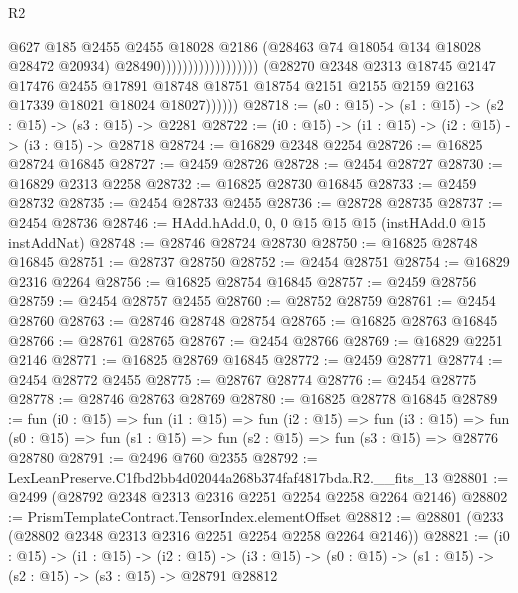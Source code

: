 \begin{lexlean}{R2}
\begin{coremodule}
                                                  @627
                                                  @185
                                                  @2455
                                                  @2455
                                                  @18028
                                                  @2186
                                                  (@28463 @74 @18054 @134 @18028 @28472 @20934)
                                                  @28490))))))))))))))))))
              (@28270
                @2348
                @2313
                @18745
                @2147
                @17476
                @2455
                @17891
                @18748
                @18751
                @18754
                @2151
                @2155
                @2159
                @2163
                @17339
                @18021
                @18024
                @18027))))))
@28718 := (s0 : @15) -> (s1 : @15) -> (s2 : @15) -> (s3 : @15) -> @2281
@28722 := (i0 : @15) -> (i1 : @15) -> (i2 : @15) -> (i3 : @15) -> @28718
@28724 := @16829 @2348 @2254
@28726 := @16825 @28724 @16845
@28727 := @2459 @28726
@28728 := @2454 @28727
@28730 := @16829 @2313 @2258
@28732 := @16825 @28730 @16845
@28733 := @2459 @28732
@28735 := @2454 @28733 @2455
@28736 := @28728 @28735
@28737 := @2454 @28736
@28746 := HAdd.hAdd.{0, 0, 0} @15 @15 @15 (instHAdd.{0} @15 instAddNat)
@28748 := @28746 @28724 @28730
@28750 := @16825 @28748 @16845
@28751 := @28737 @28750
@28752 := @2454 @28751
@28754 := @16829 @2316 @2264
@28756 := @16825 @28754 @16845
@28757 := @2459 @28756
@28759 := @2454 @28757 @2455
@28760 := @28752 @28759
@28761 := @2454 @28760
@28763 := @28746 @28748 @28754
@28765 := @16825 @28763 @16845
@28766 := @28761 @28765
@28767 := @2454 @28766
@28769 := @16829 @2251 @2146
@28771 := @16825 @28769 @16845
@28772 := @2459 @28771
@28774 := @2454 @28772 @2455
@28775 := @28767 @28774
@28776 := @2454 @28775
@28778 := @28746 @28763 @28769
@28780 := @16825 @28778 @16845
@28789 := fun (i0 : @15) =>
  fun (i1 : @15) =>
  fun (i2 : @15) =>
  fun (i3 : @15) =>
  fun (s0 : @15) => fun (s1 : @15) => fun (s2 : @15) => fun (s3 : @15) => @28776 @28780
@28791 := @2496 @760 @2355
@28792 := LexLeanPreserve.C1fbd2bb4d02044a268b374faf4817bda.R2.__fits_13
@28801 := @2499 (@28792 @2348 @2313 @2316 @2251 @2254 @2258 @2264 @2146)
@28802 := PrismTemplateContract.TensorIndex.elementOffset
@28812 := @28801 (@233 (@28802 @2348 @2313 @2316 @2251 @2254 @2258 @2264 @2146))
@28821 := (i0 : @15) ->
  (i1 : @15) ->
  (i2 : @15) -> (i3 : @15) -> (s0 : @15) -> (s1 : @15) -> (s2 : @15) -> (s3 : @15) -> @28791 @28812

\end{coremodule}
\end{lexlean}
